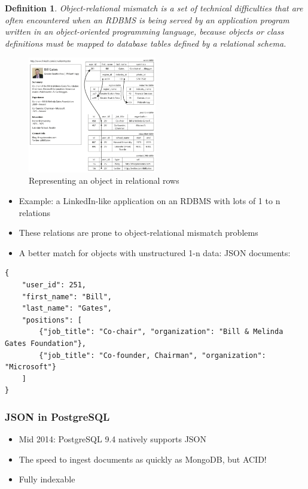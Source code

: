 \documentclass{article}
\newtheorem{theorem}{Definition}[section]
\begin{document}
\begin{theorem}
    Object-relational mismatch is a set of technical difficulties that are often
    encountered when an RDBMS is being served by an application program written 
    in an object-oriented programming language, because objects or class definitions 
    must be mapped to database tables defined by a relational schema.
\end{theorem}

\begin{figure}[H]
    \centering
    \includegraphics[width=0.5\textwidth]{billgates.png}
    \caption{Representing an object in relational rows}
\end{figure}

\begin{itemize}
    \item Example: a LinkedIn-like application on an RDBMS with lots of 1 to n relations
    \item These relations are prone to object-relational mismatch problems
    \item A better match for objects with unstructured 1-n data: JSON documents:
\end{itemize}

\begin{verbatim}
{
    "user_id": 251,
    "first_name": "Bill",
    "last_name": "Gates",
    "positions": [
        {"job_title": "Co-chair", "organization": "Bill & Melinda Gates Foundation"},
        {"job_title": "Co-founder, Chairman", "organization": "Microsoft"}
    ]
}
\end{verbatim}

\subsubsection{JSON in PostgreSQL}

\begin{itemize}
    \item Mid 2014: PostgreSQL 9.4 natively supports JSON
    \item The speed to ingest documents as quickly as MongoDB, but ACID!
    \item Fully indexable
\end{itemize}
\end{document}
